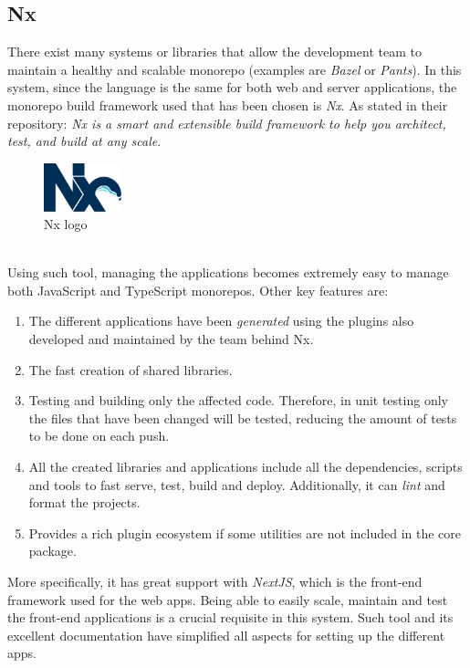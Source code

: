 \documentclass[a4paper, 12pt, oneside]{book}
\begin{document}
\subsection{Nx}
There exist many systems or libraries that allow the development team to maintain a healthy and scalable monorepo (examples are \emph{Bazel} or \emph{Pants}). In this system, since the language is the same for both web and server applications, the monorepo build framework used that has been chosen is \emph{Nx}. As stated in their repository: \emph{Nx is a smart and extensible build framework to help you architect, test, and build at any scale}.
\\
\begin{figure}[h!]
	\centering
	\includegraphics[width=0.2\textwidth]{assets/nx-logo.png}
	\caption{Nx logo}
\end{figure}
\\
Using such tool, managing the applications becomes extremely easy to manage both JavaScript and TypeScript monorepos. Other key features are:
\begin{enumerate}[label = -]
	\item The different applications have been \emph{generated} using the plugins also developed and maintained by the team behind Nx.
	\item The fast creation of shared libraries.
	\item Testing and building only the affected code. Therefore, in unit testing only the files that have been changed will be tested, reducing the amount of tests to be done on each push.
	\item All the created libraries and applications include all the dependencies, scripts and tools to fast serve, test, build and deploy. Additionally, it can \emph{lint} and format the projects.
	\item Provides a rich plugin ecosystem if some utilities are not included in the core package.
\end{enumerate}
More specifically, it has great support with \emph{NextJS}, which is the front-end framework used for the web apps. Being able to easily scale, maintain and test the front-end applications is a crucial requisite in this system. Such tool and its excellent documentation have simplified all aspects for setting up the different apps.
\\[8pt]
\end{document}
